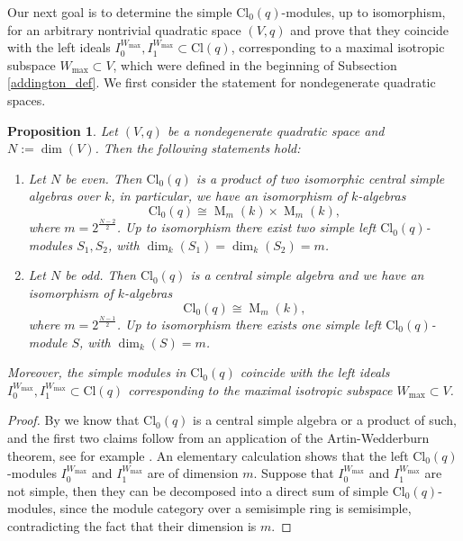 \documentclass[a4paper, twoside, 11pt]{amsart}
\newtheorem{proposition}[theorem]{Proposition}
\theoremstyle{definition}
\theoremstyle{remark}
\numberwithin{equation}{theorem}
\DeclareMathOperator{\matri}{M}
\newcommand{\wmax}{W_{\text{max}}}
\newcommand{\evencl}{\mathrm{Cl}_0}
\newcommand{\cl}{\mathrm{Cl}}
\begin{document}
Our next goal is to determine the simple $\evencl(q)$-modules, up to isomorphism, for an arbitrary nontrivial quadratic space $(V,q)$ and prove that they coincide with the left ideals $I_0^{\wmax}, I_1^{\wmax}\subset \cl(q)$, corresponding to a maximal isotropic subspace $\wmax \subset V$, which were defined in the beginning of Subsection \ref{addington_def}. We first consider the statement for nondegenerate quadratic spaces.
\begin{proposition}\label{Artin_wed_non-deg}
    Let $(V,q)$ be a nondegenerate quadratic space and $N :=\dim(V)$. Then the following statements hold:
    \begin{enumerate}[label=\roman*)]
        \item Let $N$ be even. Then $\evencl(q)$ is a product of two isomorphic central simple algebras over $k$, in particular, we have an isomorphism of $k$-algebras 
    \begin{equation*}
        \evencl(q) \cong \matri_m(k) \times \matri_m(k),
    \end{equation*}
    where $m = 2^{\frac{N-2}{2}}$. Up to isomorphism there exist two simple left $\evencl(q)$-modules $S_1,S_2$, with $\dim_k(S_1) = \dim_k(S_2) =m$.
    \item Let $N$ be odd. Then $\evencl(q)$ is a central simple algebra and we have an isomorphism of $k$-algebras 
    \begin{equation*}
        \evencl(q) \cong \matri_m(k),
    \end{equation*}
    where $m = 2^{\frac{N-1}{2}}$. Up to isomorphism there exists one simple left $\evencl(q)$-module $S$, with $\dim_k(S) = m$.
    \end{enumerate}
Moreover, the simple modules in $\evencl(q)$ coincide with the left ideals $I_0^{\wmax}, I_1^{\wmax} \subset \cl(q)$ corresponding to the maximal isotropic subspace $\wmax \subset V$.
\end{proposition}
\begin{proof}
    By \cite[§4.2]{Lam_quadratic} we know that $\evencl(q)$ is a central simple algebra or a product of such, and the first two claims follow from an application of the Artin-Wedderburn theorem, see for example \cite[§1.3.5]{Lam_non_comm}. An elementary calculation shows that the left $\evencl(q)$-modules $I_0^{\wmax}$ and $I_1^{\wmax}$ are of dimension $m$. Suppose that $I_0^{\wmax}$ and $I_1^{\wmax}$ are not simple, then they can be decomposed into a direct sum of simple $\evencl(q)$-modules, since the module category over a semisimple ring is semisimple, 
    contradicting the fact that their dimension is $m$.
\end{proof}
\end{document}
